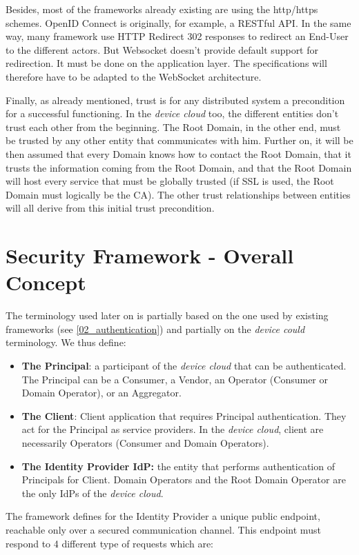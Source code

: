 Besides, most of the frameworks already existing are using the http/https schemes. OpenID Connect is originally, for example, a RESTful API. In the same way, many framework use HTTP Redirect 302 responses to redirect an End-User to the different actors. But Websocket doesn't provide default support for redirection. It must be done on the application layer. The specifications will therefore have to be adapted to the WebSocket architecture. 

Finally, as already mentioned, trust is for any distributed system a precondition for a successful functioning. In the \emph{device cloud} too, the different entities don't trust each other from the beginning. The Root Domain, in the other end, must be trusted by any other entity that communicates with him. Further on, it will be then assumed that every Domain knows how to contact the Root Domain, that it trusts the information coming from the Root Domain, and that the Root Domain will host every service that must be globally trusted (if SSL is used, the Root Domain must logically be the CA). The other trust relationships between entities will all derive from this initial trust precondition.

\section{Security Framework - Overall Concept}
\label{sec:04_framework}

The terminology used later on is partially based on the one used by existing frameworks (see \ref{02_authentication}) and partially on the \emph{device could} terminology. We thus define:
\begin{itemize}
	\item \textbf{The Principal}: a participant of the \emph{device cloud} that can be authenticated. The Principal can be a Consumer, a Vendor, an Operator (Consumer or Domain Operator), or an Aggregator.
	\item \textbf{The Client}: Client application that requires Principal authentication. They act for the Principal as service providers. In the \emph{device cloud}, client are necessarily Operators (Consumer and Domain Operators).
	\item \textbf{The Identity Provider IdP: } the entity that performs authentication of Principals for Client. Domain Operators and the Root Domain Operator are the only IdPs of the \emph{device cloud}. 
\end{itemize}

The framework defines for the Identity Provider a unique public endpoint, reachable only over a secured communication channel. This endpoint must respond to 4 different type of requests which are:

